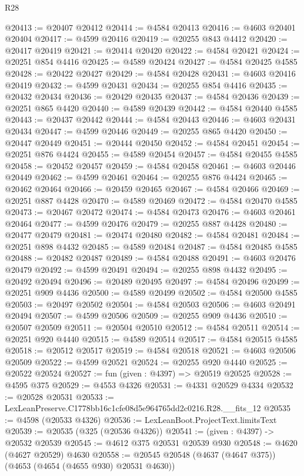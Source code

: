 \begin{lexlean}{R28}
\begin{coremodule}
@20413 := @20407 @20412
@20414 := @4584 @20413
@20416 := @4603 @20401 @20404
@20417 := @4599 @20416
@20419 := @20255 @843 @4412
@20420 := @20417 @20419
@20421 := @20414 @20420
@20422 := @4584 @20421
@20424 := @20251 @854 @4416
@20425 := @4589 @20424
@20427 := @4584 @20425 @4585
@20428 := @20422 @20427
@20429 := @4584 @20428
@20431 := @4603 @20416 @20419
@20432 := @4599 @20431
@20434 := @20255 @854 @4416
@20435 := @20432 @20434
@20436 := @20429 @20435
@20437 := @4584 @20436
@20439 := @20251 @865 @4420
@20440 := @4589 @20439
@20442 := @4584 @20440 @4585
@20443 := @20437 @20442
@20444 := @4584 @20443
@20446 := @4603 @20431 @20434
@20447 := @4599 @20446
@20449 := @20255 @865 @4420
@20450 := @20447 @20449
@20451 := @20444 @20450
@20452 := @4584 @20451
@20454 := @20251 @876 @4424
@20455 := @4589 @20454
@20457 := @4584 @20455 @4585
@20458 := @20452 @20457
@20459 := @4584 @20458
@20461 := @4603 @20446 @20449
@20462 := @4599 @20461
@20464 := @20255 @876 @4424
@20465 := @20462 @20464
@20466 := @20459 @20465
@20467 := @4584 @20466
@20469 := @20251 @887 @4428
@20470 := @4589 @20469
@20472 := @4584 @20470 @4585
@20473 := @20467 @20472
@20474 := @4584 @20473
@20476 := @4603 @20461 @20464
@20477 := @4599 @20476
@20479 := @20255 @887 @4428
@20480 := @20477 @20479
@20481 := @20474 @20480
@20482 := @4584 @20481
@20484 := @20251 @898 @4432
@20485 := @4589 @20484
@20487 := @4584 @20485 @4585
@20488 := @20482 @20487
@20489 := @4584 @20488
@20491 := @4603 @20476 @20479
@20492 := @4599 @20491
@20494 := @20255 @898 @4432
@20495 := @20492 @20494
@20496 := @20489 @20495
@20497 := @4584 @20496
@20499 := @20251 @909 @4436
@20500 := @4589 @20499
@20502 := @4584 @20500 @4585
@20503 := @20497 @20502
@20504 := @4584 @20503
@20506 := @4603 @20491 @20494
@20507 := @4599 @20506
@20509 := @20255 @909 @4436
@20510 := @20507 @20509
@20511 := @20504 @20510
@20512 := @4584 @20511
@20514 := @20251 @920 @4440
@20515 := @4589 @20514
@20517 := @4584 @20515 @4585
@20518 := @20512 @20517
@20519 := @4584 @20518
@20521 := @4603 @20506 @20509
@20522 := @4599 @20521
@20524 := @20255 @920 @4440
@20525 := @20522 @20524
@20527 := fun (given : @4397) => @20519 @20525
@20528 := @4595 @375
@20529 := @4553 @4326
@20531 := @4331 @20529 @4334
@20532 := @20528 @20531
@20533 := LexLeanPreserve.C1778bb16c1cfe08d5e964765dd2c0216.R28.__fits_12
@20535 := @4598 (@20533 @4326)
@20536 := LexLeanBoot.ProjectText.limitsText
@20539 := @20535 (@325 (@20536 @4326))
@20541 := (given : @4397) -> @20532 @20539
@20545 := @4612 @375 @20531 @20539 @930
@20548 := @4620 (@4627 @20529) @4630
@20558 := @20545 @20548 (@4637 (@4647 @375)) (@4653 (@4654 (@4655 @930) @20531 @4630))

\end{coremodule}
\end{lexlean}
